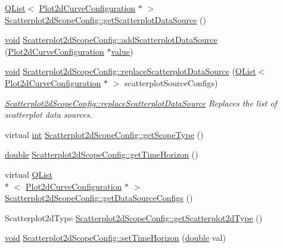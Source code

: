 \begin{DoxyCompactItemize}
\item 
\hyperlink{class_q_list}{Q\-List}$<$ \hyperlink{struct_plot2d_curve_configuration}{Plot2d\-Curve\-Configuration} $\ast$ $>$ \hyperlink{group___scope_plugin_ga56246d3456c2ccf8cc5a851d3fd956f4}{Scatterplot2d\-Scope\-Config\-::get\-Scatterplot\-Data\-Source} ()
\item 
\hyperlink{group___u_a_v_objects_plugin_ga444cf2ff3f0ecbe028adce838d373f5c}{void} \hyperlink{group___scope_plugin_gac77a97364a3c7dc1e41da11bd400c551}{Scatterplot2d\-Scope\-Config\-::add\-Scatterplot\-Data\-Source} (\hyperlink{struct_plot2d_curve_configuration}{Plot2d\-Curve\-Configuration} $\ast$\hyperlink{glext_8h_aa0e2e9cea7f208d28acda0480144beb0}{value})
\item 
\hyperlink{group___u_a_v_objects_plugin_ga444cf2ff3f0ecbe028adce838d373f5c}{void} \hyperlink{group___scope_plugin_ga9fa344bf8a33a2d154be6922d8cc7915}{Scatterplot2d\-Scope\-Config\-::replace\-Scatterplot\-Data\-Source} (\hyperlink{class_q_list}{Q\-List}$<$ \hyperlink{struct_plot2d_curve_configuration}{Plot2d\-Curve\-Configuration} $\ast$ $>$ scatterplot\-Source\-Configs)
\begin{DoxyCompactList}\small\item\em \hyperlink{group___scope_plugin_ga9fa344bf8a33a2d154be6922d8cc7915}{Scatterplot2d\-Scope\-Config\-::replace\-Scatterplot\-Data\-Source} Replaces the list of scatterplot data sources. \end{DoxyCompactList}\item 
virtual \hyperlink{ioapi_8h_a787fa3cf048117ba7123753c1e74fcd6}{int} \hyperlink{group___scope_plugin_gaca53d526ca13b2be6f8e11ea754929a7}{Scatterplot2d\-Scope\-Config\-::get\-Scope\-Type} ()
\item 
\hyperlink{_super_l_u_support_8h_a8956b2b9f49bf918deed98379d159ca7}{double} \hyperlink{group___scope_plugin_ga66b9fcd762689ee3c5692552de87d7d1}{Scatterplot2d\-Scope\-Config\-::get\-Time\-Horizon} ()
\item 
virtual \hyperlink{class_q_list}{Q\-List}\\*
$<$ \hyperlink{struct_plot2d_curve_configuration}{Plot2d\-Curve\-Configuration} $\ast$ $>$ \hyperlink{group___scope_plugin_ga7ca2caad5fa0ed638d0681c5d3270241}{Scatterplot2d\-Scope\-Config\-::get\-Data\-Source\-Configs} ()
\item 
Scatterplot2d\-Type \hyperlink{group___scope_plugin_ga09fc23adf2e2a28804bcf775ea00057c}{Scatterplot2d\-Scope\-Config\-::get\-Scatterplot2d\-Type} ()
\item 
\hyperlink{group___u_a_v_objects_plugin_ga444cf2ff3f0ecbe028adce838d373f5c}{void} \hyperlink{group___scope_plugin_gaecbec1456088d121dbf2b9f63a45c6ab}{Scatterplot2d\-Scope\-Config\-::set\-Time\-Horizon} (\hyperlink{_super_l_u_support_8h_a8956b2b9f49bf918deed98379d159ca7}{double} val)

\end{DoxyCompactItemize}
